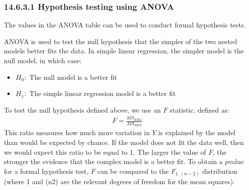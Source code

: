 \documentclass[letterpaper,10pt,english]{jupyterBook}
\begin{document}
\subsubsection{14.6.3.1 Hypothesis testing using ANOVA}
\label{\detokenize{14.g. Linear Regression III:hypothesis-testing-using-anova}}
\sphinxAtStartPar
The values in the ANOVA table can be used to conduct formal hypothesis tests.

\sphinxAtStartPar
ANOVA is used to test the null hypothesis that the simpler of the two nested models better fits the data. In simple linear regression, the simpler model is the null model, in which case:
\begin{itemize}
\item {} 
\sphinxAtStartPar
\(H_0:\) The null model is a better fit

\item {} 
\sphinxAtStartPar
\(H_1:\) The simple linear regression model is a better fit

\end{itemize}

\sphinxAtStartPar
To test the null hypothesis defined above, we use an \(F\) statistic, defined as:
\begin{equation*}
\begin{split}
F = \frac{MS_{REG}}{MS_{RES}}
\end{split}
\end{equation*}
\sphinxAtStartPar
This ratio measures how much more variation in \(Y\) is explained by the model than would be expected by chance. If the model does not fit the data well, then we would expect this ratio to be equal to 1. The larger the value of \(F\), the stronger the evidence that the complex model is a better fit. To obtain a \(p\)\sphinxhyphen{}value for a formal hypothesis test, \(F\) can be compared to the \(F_{1,(n-2)}\) distribution (where 1 and (n\sphinxhyphen{}2) are the relevant degrees of freedom for the mean squares).
\end{document}
